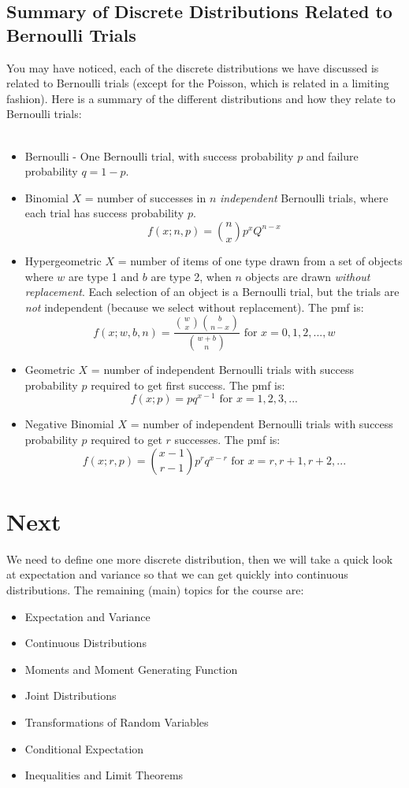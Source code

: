 \documentclass[12pt]{article} %
\begin{document}
\subsection{Summary of Discrete Distributions Related to Bernoulli Trials}
You may have noticed, each of the discrete distributions we have discussed is related to Bernoulli trials (except for the Poisson, which is related in a limiting fashion). Here is a summary of the different distributions and how they relate to Bernoulli trials:\\\\
\begin{itemize}
\item Bernoulli - One Bernoulli trial, with success probability $p$ and failure probability $q=1-p$.
\item Binomial $X$ = number of successes in $n$ \emph{independent} Bernoulli trials, where each trial has success probability $p$.
$$f(x;n,p) = {n\choose{x}}p^xQ^{n-x}$$
\item Hypergeometric $X$ = number of items of one type drawn from a set of objects where $w$ are type 1 and $b$ are type 2, when $n$ objects are drawn \emph{without replacement}. Each selection of an object is a Bernoulli trial, but the trials are \emph{not} independent (because we select without replacement). The pmf is:
$$f(x;w,b,n) = \frac{{w\choose{x}}{b\choose{n-x}}}{{{w+b}\choose{n}}} \textrm{ for } x=0,1,2,...,w$$
\item Geometric $X$ = number of independent Bernoulli trials with success probability $p$ required to get first success. The pmf is:
$$f(x;p) = pq^{x-1} \textrm { for } x=1,2,3,...$$
\item Negative Binomial $X$ = number of independent Bernoulli trials with success probability $p$ required to get $r$ successes. The pmf is:
$$f(x;r,p) = {{x-1}\choose{r-1}}p^rq^{x-r} \textrm{ for } x=r,r+1,r+2,...$$
\end{itemize}
\section{Next}
We need to define one more discrete distribution, then we will take a quick look at expectation and variance so that we can get quickly into continuous distributions. The remaining (main) topics for the course are:
\begin{itemize}
\item Expectation and Variance
\item Continuous Distributions
\item Moments and Moment Generating Function
\item Joint Distributions
\item Transformations of Random Variables
\item Conditional Expectation
\item Inequalities and Limit Theorems
\end{itemize}
\end{document}
